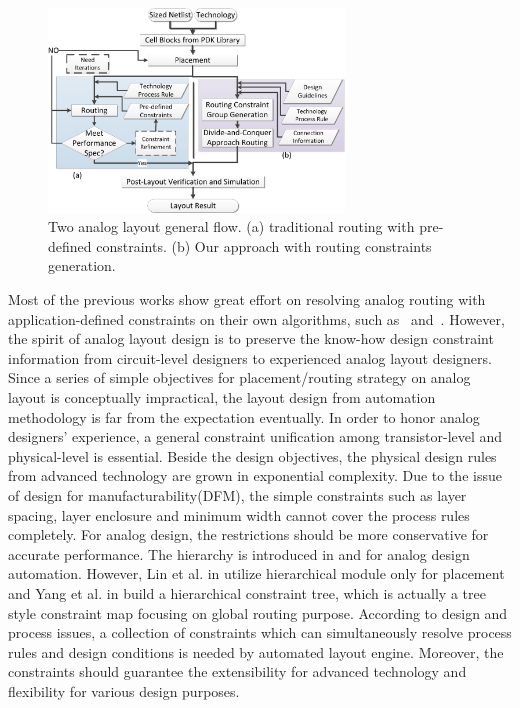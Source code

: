         \begin{figure}[ht]
          \centerline{
            \includegraphics[width=0.7\textwidth]{Fig/Introduction/LayoutFlow.eps}
          }
          \caption{Two analog layout general flow. (a) traditional routing with pre-defined constraints. (b) Our approach with routing constraints generation. }
          \label{fig:LayoutFlow}
        \end{figure}
        Most of the previous works show great effort on resolving analog routing with application-defined constraints on their own algorithms, such as~\cite{anrmfca-CICC1990,sensitAR-iccad90} and~\cite{arearouting-tcad1993}. However, the spirit of analog layout design is to preserve the know-how design constraint information from circuit-level designers to experienced analog layout designers. Since a series of simple objectives for placement/routing strategy on analog layout is conceptually impractical, the layout design from automation methodology is far from the expectation eventually. In order to honor analog designers' experience, a general constraint unification among transistor-level and physical-level is essential. Beside the design objectives, the physical design rules from advanced technology are grown in exponential complexity. Due to the issue of design for manufacturability(DFM), the simple constraints such as layer spacing, layer enclosure and minimum width cannot cover the process rules completely. For analog design, the restrictions should be more conservative for accurate performance. The hierarchy is introduced in \cite{phLin-dac2008} and \cite{ymYang-isqed2010} for analog design automation. However, Lin et al. in \cite{phLin-dac2008} utilize hierarchical module only for placement and Yang et al. in \cite{ymYang-isqed2010} build a hierarchical constraint tree, which is actually a tree style constraint map focusing on global routing purpose. According to design and process issues, a collection of constraints which can simultaneously resolve process rules and design conditions is needed by automated layout engine. Moreover, the constraints should guarantee the extensibility for advanced technology and flexibility for various design purposes.   

